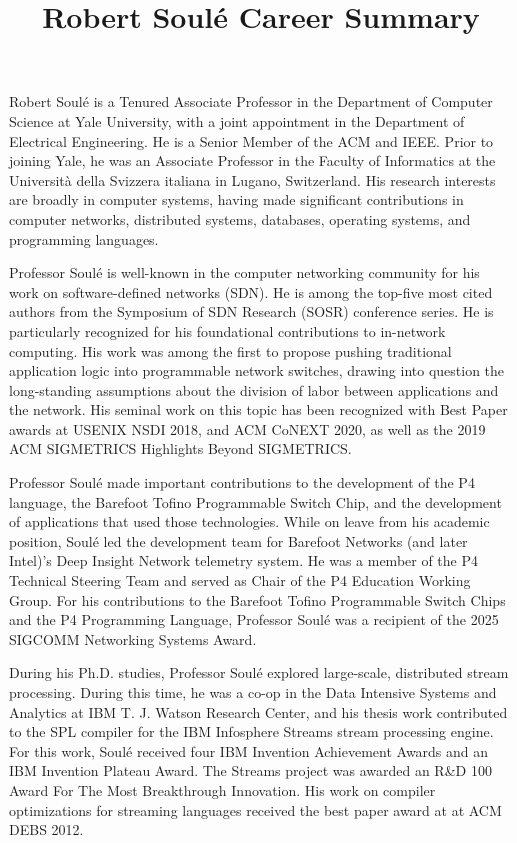 \documentclass[11pt]{article}
\title{ Robert Soul\'{e} Career Summary}
\author{  }
\date{ }
\begin{document}
\maketitle	
\thispagestyle{empty}


Robert Soul\'{e} is a Tenured Associate Professor in the Department of
Computer Science at Yale University, with a joint appointment in the
Department of Electrical Engineering. He is a Senior Member of 
the ACM and IEEE.  Prior to joining Yale, he was an Associate
Professor in the Faculty of Informatics at the Universit\`{a} della
Svizzera italiana in Lugano, Switzerland. His research interests are
broadly in computer systems, having made significant contributions
in computer networks, distributed systems, databases, operating systems,
and programming languages.



Professor Soul\'{e} is well-known in the computer networking community
for his work on software-defined networks (SDN). He is among the
top-five most cited authors from the Symposium of SDN Research (SOSR)
conference series. He is particularly recognized for his foundational
contributions to in-network computing.  His work was among the first
to propose pushing traditional application logic into programmable
network switches, drawing
into question the long-standing assumptions about the division of
labor between applications and the network. His seminal work on this topic has
been recognized with Best Paper awards at USENIX NSDI 2018, and ACM CoNEXT 2020,
as well as the 2019 ACM SIGMETRICS Highlights Beyond SIGMETRICS.


Professor Soul\'{e} made important contributions to the development of the P4
language, the Barefoot Tofino Programmable Switch Chip,
and the development of applications that used those
technologies. While on leave from his academic position, Soul\'{e} led
the development team for Barefoot Networks (and later Intel)'s Deep
Insight Network telemetry system. He was a member of the
P4 Technical Steering Team and served as Chair of the P4 Education
Working Group. For his contributions to the Barefoot Tofino
Programmable Switch Chips and the P4 Programming Language, Professor
Soul\'{e} was a recipient of the 2025 SIGCOMM Networking Systems
Award.


During his Ph.D. studies, Professor Soul\'{e} explored large-scale,
distributed stream processing. During this time, he was a co-op in the
Data Intensive Systems and Analytics at IBM T. J. Watson Research
Center, and his thesis work contributed to the SPL compiler for the
IBM Infosphere Streams stream processing engine. For this work,
Soul\'{e} received four IBM Invention Achievement Awards and an IBM
Invention Plateau Award. The Streams project was awarded an R\&D 100
Award For The Most Breakthrough Innovation.  His work on compiler
optimizations for streaming languages received the best paper award at
at ACM DEBS 2012.
\end{document}
